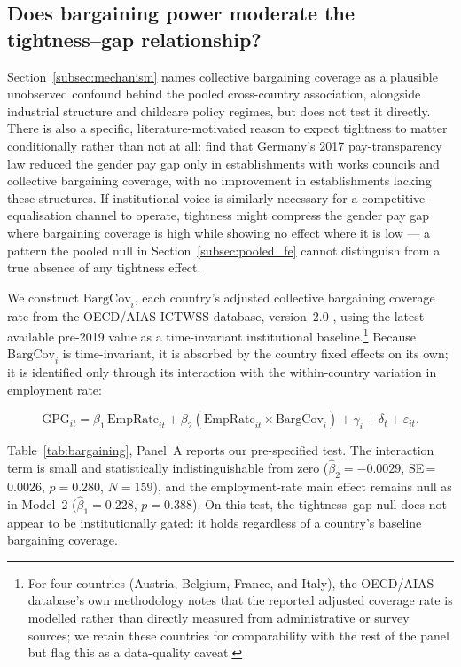 \documentclass[12pt,a4paper]{article}
\begin{document}
\subsection{Does bargaining power moderate the tightness--gap relationship?}
\label{subsec:bargaining}

Section~\ref{subsec:mechanism} names collective bargaining coverage as a
plausible unobserved confound behind the pooled cross-country association,
alongside industrial structure and childcare policy regimes, but does not
test it directly.  There is also a specific, literature-motivated reason to
expect tightness to matter conditionally rather than not at all:
\citet{VaccaroEtAl2024} find that Germany's 2017 pay-transparency law reduced
the gender pay gap only in establishments with works councils and collective
bargaining coverage, with no improvement in establishments lacking these
structures.  If institutional voice is similarly necessary for a
competitive-equalisation channel to operate, tightness might compress the
gender pay gap where bargaining coverage is high while showing no effect
where it is low --- a pattern the pooled null in Section~\ref{subsec:pooled_fe}
cannot distinguish from a true absence of any tightness effect.

We construct $\text{BargCov}_i$, each country's adjusted collective
bargaining coverage rate from the OECD/AIAS ICTWSS database, version~2.0
\citep{OECDAIAS2025}, using the latest available pre-2019 value as a
time-invariant institutional baseline.\footnote{For four countries (Austria,
Belgium, France, and Italy), the OECD/AIAS database's own methodology notes
that the reported adjusted coverage rate is modelled rather than directly
measured from administrative or survey sources; we retain these countries for
comparability with the rest of the panel but flag this as a data-quality
caveat.}  Because $\text{BargCov}_i$ is time-invariant, it is absorbed by the
country fixed effects on its own; it is identified only through its
interaction with the within-country variation in employment rate:

\begin{equation}
\text{GPG}_{it} = \beta_1 \,\text{EmpRate}_{it}
  + \beta_2 \left(\text{EmpRate}_{it} \times \text{BargCov}_i\right)
  + \gamma_i + \delta_t + \varepsilon_{it}.
\label{eq:bargaining}
\end{equation}

Table~\ref{tab:bargaining}, Panel~A reports our pre-specified test.  The
interaction term is small and statistically indistinguishable from zero
($\hat\beta_2=-0.0029$, SE\,=\,0.0026, $p=0.280$, $N=159$), and the
employment-rate main effect remains null as in Model~2
($\hat\beta_1=0.228$, $p=0.388$).  On this test, the tightness--gap null does
not appear to be institutionally gated: it holds regardless of a country's
baseline bargaining coverage.
\end{document}
